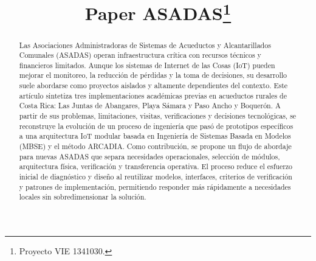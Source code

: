 \documentclass[conference]{IEEEtran}
\begin{document}
\title{Paper ASADAS\thanks{Proyecto VIE 1341030.}}

\author{
\and
{}
\and
{}
\and
{}
}

\maketitle

\begin{abstract}
Las Asociaciones Administradoras de Sistemas de Acueductos y Alcantarillados Comunales (ASADAS) operan infraestructura crítica con recursos técnicos y financieros limitados. Aunque los sistemas de Internet de las Cosas (IoT) pueden mejorar el monitoreo, la reducción de pérdidas y la toma de decisiones, su desarrollo suele abordarse como proyectos aislados y altamente dependientes del contexto. Este artículo sintetiza tres implementaciones académicas previas en acueductos rurales de Costa Rica: Las Juntas de Abangares, Playa Sámara y Paso Ancho y Boquerón. A partir de sus problemas, limitaciones, visitas, verificaciones y decisiones tecnológicas, se reconstruye la evolución de un proceso de ingeniería que pasó de prototipos específicos a una arquitectura IoT modular basada en Ingeniería de Sistemas Basada en Modelos (MBSE) y el método ARCADIA. Como contribución, se propone un flujo de abordaje para nuevas ASADAS que separa necesidades operacionales, selección de módulos, arquitectura física, verificación y transferencia operativa. El proceso reduce el esfuerzo inicial de diagnóstico y diseño al reutilizar modelos, interfaces, criterios de verificación y patrones de implementación, permitiendo responder más rápidamente a necesidades locales sin sobredimensionar la solución.
\end{abstract}
\end{document}
